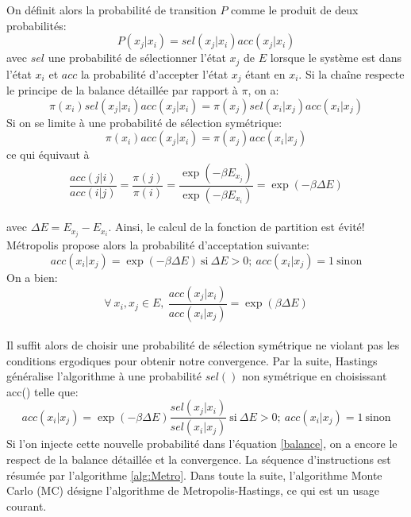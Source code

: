 On définit alors la probabilité de transition $P$ comme le produit de deux probabilités:
\begin{equation}
  \label{decomp_Metro}
P (x_j|x_i) = sel(x_j|x_i)acc(x_j|x_i)
\end{equation}
avec $sel$ une probabilité de sélectionner l'état $x_j$ de $E$ lorsque le système est dans l'état $x_i$ et $acc$ la probabilité d'accepter l'état $x_j$ étant en $x_i$. Si la chaîne respecte le principe de la balance détaillée par rapport à $\pi$, on a:
\begin{equation}
  \label{balance}
\pi(x_i)sel(x_j|x_i)acc(x_j|x_i) = \pi(x_j)sel(x_i|x_j)acc(x_i|x_j) 
\end{equation}
Si on se limite à une probabilité de sélection symétrique:
\begin{equation}
    \label{bd_Metropolis}
\pi(x_i)acc(x_j|x_i) = \pi(x_j)acc(x_i|x_j) 
\end{equation}
ce qui équivaut à
\begin{equation}
\frac{acc(j|i)}{acc(i|j)} =\frac{\pi(j)}{\pi(i)} = \frac{\exp(-\beta E_{x_j})}{\exp(-\beta E_{x_i})} = \exp(-\beta \Delta E) 
\end{equation}\\
avec $\Delta E =  E_{x_j} - E_{x_i}$. Ainsi, le calcul de la fonction de partition est évité! Métropolis propose alors la probabilité d'acceptation suivante: 
\begin{equation}
acc(x_i|x_j) = \exp(- \beta \Delta E)\ \text{si}\ \Delta E >0;\ acc(x_i|x_j)=1\ \text{sinon}
\end{equation}
On a bien: 
\begin{equation}
\forall\ x_i, x_j \in E,\ \frac{acc(x_j|x_i)}{acc(x_i|x_j)} = \exp(\beta \Delta E)
\end{equation}\\
Il suffit alors de choisir une probabilité de sélection symétrique ne violant pas les conditions ergodiques pour obtenir notre convergence. Par la suite, Hastings généralise l'algorithme à une probabilité $sel()$ non symétrique en choisissant acc() telle que:
\begin{equation}\label{eq:Hasting}
acc(x_i|x_j) = \exp(-\beta \Delta E) \frac{sel(x_j|x_i)}{sel(x_i|x_j)}\ \text{si}\ \Delta E >0;\ acc(x_i|x_j)=1\ \text{sinon}
\end{equation}
Si l'on injecte cette nouvelle probabilité dans l'équation \ref{balance}, on a encore le respect de la balance détaillée et la convergence. La séquence d'instructions est résumée par l'algorithme \ref{alg:Metro}. Dans toute la suite, l'algorithme Monte Carlo (MC) désigne l'algorithme de Metropolis-Hastings, ce qui est un usage courant.

